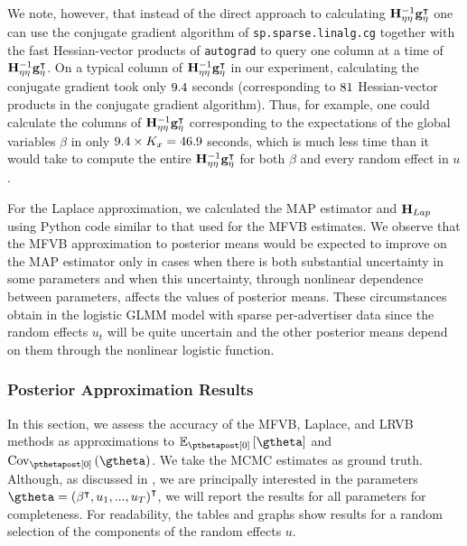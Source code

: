 \documentclass{article}\usepackage[]{graphicx}\usepackage[]{color}
\theoremstyle{definition}
\theoremstyle{plain}
\theoremstyle{plain}
\theoremstyle{plain}
\theoremstyle{definition}
\theoremstyle{plain}
\theoremstyle{plain}
\begin{document}
We note, however, that instead of the direct approach to calculating
$\mathbf{H}_{\eta\eta}^{-1}\mathbf{g}_{\eta}^{\intercal}$ one can use the conjugate gradient algorithm of
\texttt{sp.sparse.linalg.cg} \citep[Chapter 5]{nocedalwright:1999:numerical}
together with the fast Hessian-vector products of \texttt{autograd} to query one
column at a time of $\mathbf{H}_{\eta\eta}^{-1}\mathbf{g}_{\eta}^{\intercal}$. On a typical column of
$\mathbf{H}_{\eta\eta}^{-1}\mathbf{g}_{\eta}^{\intercal}$ in our experiment, calculating the conjugate
gradient took only $9.4$ seconds (corresponding to $81$
Hessian-vector products in the conjugate gradient algorithm). Thus, for example,
one could calculate the columns of $\mathbf{H}_{\eta\eta}^{-1}\mathbf{g}_{\eta}^{\intercal}$ corresponding
to the expectations of the global variables $\beta$ in only
$9.4\times K_{x}=46.9$ seconds, which is much less time
than it would take to compute the entire $\mathbf{H}_{\eta\eta}^{-1}\mathbf{g}_{\eta}^{\intercal}$ for both
$\beta$ and every random effect in $u$.

For the Laplace approximation, we calculated the MAP estimator and
$\mathbf{H}_{Lap}$ using Python code similar to that used for the MFVB estimates.
We observe that the MFVB approximation to posterior means would
be expected to improve on the MAP estimator only in cases when there is
both substantial uncertainty in some parameters and when this uncertainty,
through nonlinear dependence between parameters, affects the values
of posterior means. These circumstances obtain in the logistic GLMM
model with sparse per-advertiser data since the random effects $u_{t}$
will be quite uncertain and the other posterior means depend on them
through the nonlinear logistic function.

\subsubsection{Posterior Approximation Results\label{subsec:glmm_Means-and-variances}}

In this section, we assess the accuracy of the MFVB, Laplace, and LRVB methods
as approximations to $\mbe_{\pzeropost}\left[\gtheta\right]$ and
$\pcov\left(\gtheta\right)$. We take the MCMC estimates as ground truth.
Although, as discussed in , we are principally
interested in the parameters
$\gtheta=\left(\beta^{\trans},u_{1},...,u_{T}\right)^{\trans}$, we will report
the results for all parameters for completeness. For readability, the tables and
graphs show results for a random selection of the components of the random
effects $u$.
\end{document}
